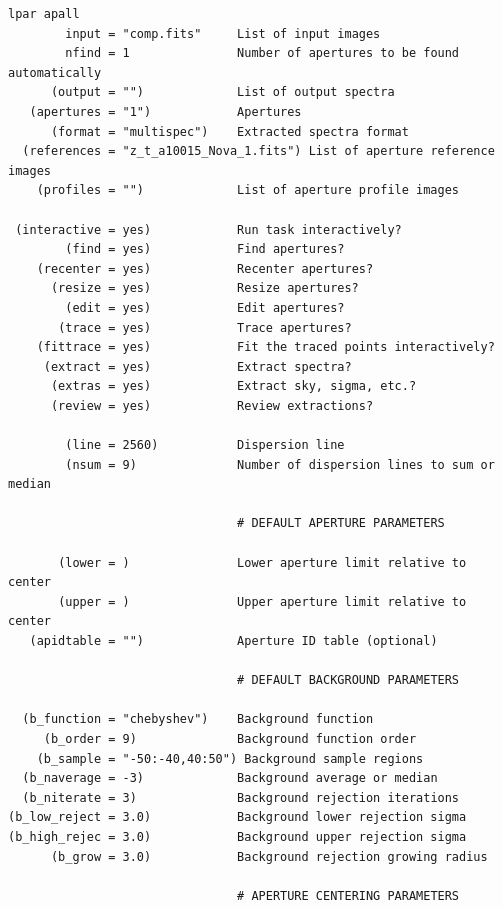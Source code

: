 \documentclass[letter,11pt,oneside]{article}
\begin{document}
\begin{verbatim} 
lpar apall
        input = "comp.fits"     List of input images
        nfind = 1               Number of apertures to be found automatically
      (output = "")             List of output spectra
   (apertures = "1")            Apertures
      (format = "multispec")    Extracted spectra format
  (references = "z_t_a10015_Nova_1.fits") List of aperture reference images
    (profiles = "")             List of aperture profile images
                                
 (interactive = yes)            Run task interactively?
        (find = yes)            Find apertures?
    (recenter = yes)            Recenter apertures?
      (resize = yes)            Resize apertures?
        (edit = yes)            Edit apertures?
       (trace = yes)            Trace apertures?
    (fittrace = yes)            Fit the traced points interactively?
     (extract = yes)            Extract spectra?
      (extras = yes)            Extract sky, sigma, etc.?
      (review = yes)            Review extractions?
                                
        (line = 2560)           Dispersion line
        (nsum = 9)              Number of dispersion lines to sum or median
                                
                                # DEFAULT APERTURE PARAMETERS
                                
       (lower = )               Lower aperture limit relative to center
       (upper = )               Upper aperture limit relative to center
   (apidtable = "")             Aperture ID table (optional)
                                
                                # DEFAULT BACKGROUND PARAMETERS
                                
  (b_function = "chebyshev")    Background function
     (b_order = 9)              Background function order
    (b_sample = "-50:-40,40:50") Background sample regions
  (b_naverage = -3)             Background average or median
  (b_niterate = 3)              Background rejection iterations
(b_low_reject = 3.0)            Background lower rejection sigma
(b_high_rejec = 3.0)            Background upper rejection sigma
      (b_grow = 3.0)            Background rejection growing radius
                                
                                # APERTURE CENTERING PARAMETERS
                                

\end{verbatim}
\end{document}
